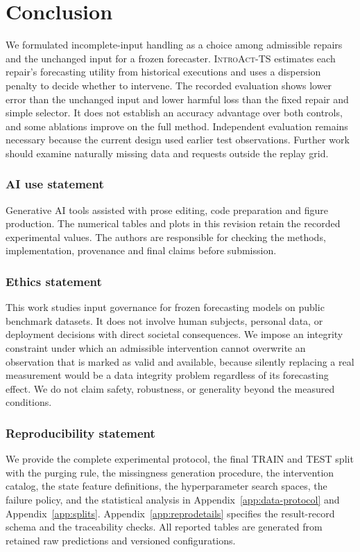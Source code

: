 \documentclass{article}
\newcommand{\introact}{\textsc{IntroAct-TS}}
\begin{document}
\section{Conclusion}
\label{sec:conclusion}
We formulated incomplete-input handling as a choice among admissible repairs and the unchanged
input for a frozen forecaster. \introact{} estimates each repair's forecasting utility from
historical executions and uses a dispersion penalty to decide whether to intervene.
The recorded evaluation shows lower error than the unchanged input and lower harmful loss
than the fixed repair and simple selector. It does not establish an accuracy advantage over
both controls, and some ablations improve on the full method. Independent evaluation remains
necessary because the current design used earlier test observations. Further work should
examine naturally missing data and requests outside the replay grid.

\subsubsection*{AI use statement}
Generative AI tools assisted with prose editing, code preparation and figure production.
The numerical tables and plots in this revision retain the recorded experimental values.
The authors are responsible for checking the methods, implementation, provenance and final
claims before submission.

\subsubsection*{Ethics statement}
This work studies input governance for frozen forecasting models on public benchmark datasets.
It does not involve human subjects, personal data, or deployment decisions with direct
societal consequences. We impose an integrity constraint under which an admissible
intervention cannot overwrite an observation that is marked as valid and available, because
silently replacing a real measurement would be a data integrity problem regardless of its
forecasting effect. We do not claim safety, robustness, or generality beyond the measured
conditions.

\subsubsection*{Reproducibility statement}
We provide the complete experimental protocol, the final TRAIN and TEST split with the
purging rule, the missingness generation procedure, the intervention catalog, the state
feature definitions, the hyperparameter search spaces, the failure policy, and the statistical
analysis in Appendix~\ref{app:data-protocol} and Appendix~\ref{app:splits}.
Appendix~\ref{app:reprodetails} specifies the result-record schema and the traceability checks.
All reported tables are generated from retained raw predictions and versioned configurations.
\end{document}
